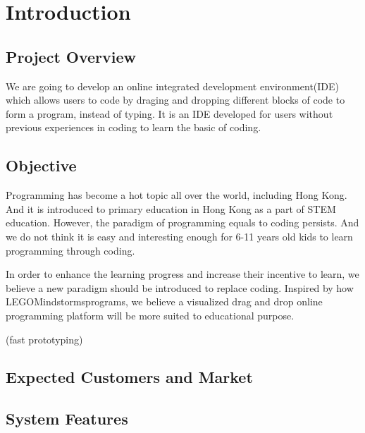 \documentclass[CSCI3100_Documentation]{subfiles}
\begin{document}
  \section{Introduction}
  \subsection{Project Overview}
  We are going to develop an online integrated development environment(IDE) which allows users to code by draging and dropping different blocks of code to form a program, instead of typing. It is an IDE developed for users without previous experiences in coding to learn the basic of coding.
  \subsection{Objective}
  Programming has become a hot topic all over the world, including Hong Kong. And it is introduced to primary education in Hong Kong as a part of STEM education. However, the paradigm of programming equals to coding persists. And we do not think it is easy and interesting enough for 6-11 years old kids to learn programming through coding.

  In order to enhance the learning progress and increase their incentive to learn, we believe a new paradigm should be introduced to replace coding. Inspired by how LEGO\textregistered Mindstorms\textregistered programs, we believe a visualized drag and drop online programming platform will be more suited to educational purpose.

  (fast prototyping)
  \subsection{Expected Customers and Market}
  \subsection{System Features}
\end{document}
